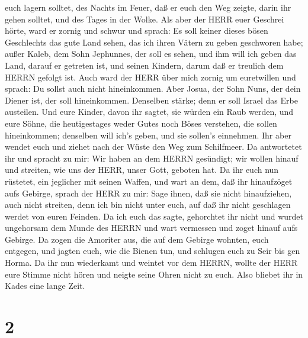 euch lagern solltet, des Nachts im Feuer, daß er euch den Weg zeigte,
darin ihr gehen solltet, und des Tages in der Wolke.  Als
aber der HERR euer Geschrei hörte, ward er zornig und schwur und sprach:
 Es soll keiner dieses bösen Geschlechts das gute Land
sehen, das ich ihren Vätern zu geben geschworen habe; 
außer Kaleb, dem Sohn Jephunnes, der soll es sehen, und ihm will ich
geben das Land, darauf er getreten ist, und seinen Kindern, darum daß er
treulich dem HERRN gefolgt ist.  Auch ward der HERR über
mich zornig um euretwillen und sprach: Du sollst auch nicht
hineinkommen.  Aber Josua, der Sohn Nuns, der dein Diener
ist, der soll hineinkommen. Denselben stärke; denn er soll Israel das
Erbe austeilen.  Und eure Kinder, davon ihr sagtet, sie
würden ein Raub werden, und eure Söhne, die heutigestages weder Gutes
noch Böses verstehen, die sollen hineinkommen; denselben will ich's
geben, und sie sollen's einnehmen.  Ihr aber wendet euch
und ziehet nach der Wüste den Weg zum Schilfmeer.  Da
antwortetet ihr und spracht zu mir: Wir haben an dem HERRN gesündigt;
wir wollen hinauf und streiten, wie uns der HERR, unser Gott, geboten
hat. Da ihr euch nun rüstetet, ein jeglicher mit seinen Waffen, und wart
an dem, daß ihr hinaufzöget aufs Gebirge,  sprach der HERR
zu mir: Sage ihnen, daß sie nicht hinaufziehen, auch nicht streiten,
denn ich bin nicht unter euch, auf daß ihr nicht geschlagen werdet von
euren Feinden.  Da ich euch das sagte, gehorchtet ihr nicht
und wurdet ungehorsam dem Munde des HERRN und wart vermessen und zoget
hinauf aufs Gebirge.  Da zogen die Amoriter aus, die auf
dem Gebirge wohnten, euch entgegen, und jagten euch, wie die Bienen tun,
und schlugen euch zu Seir bis gen Horma.  Da ihr nun
wiederkamt und weintet vor dem HERRN, wollte der HERR eure Stimme nicht
hören und neigte seine Ohren nicht zu euch.  Also bliebet
ihr in Kades eine lange Zeit.

\hypertarget{section-1}{%
\section{2}\label{section-1}}

